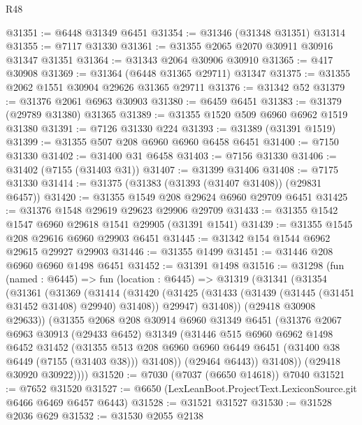 \begin{lexlean}{R48}
\begin{coremodule}
@31351 := @6448 @31349 @6451
@31354 := @31346 (@31348 @31351) @31314
@31355 := @7117 @31330
@31361 := @31355 @2065 @2070 @30911 @30916 @31347 @31351
@31364 := @31343 @2064 @30906 @30910
@31365 := @417 @30908
@31369 := @31364 (@6448 @31365 @29711) @31347
@31375 := @31355 @2062 @1551 @30904 @29626 @31365 @29711
@31376 := @31342 @52
@31379 := @31376 @2061 @6963 @30903
@31380 := @6459 @6451
@31383 := @31379 (@29789 @31380) @31365
@31389 := @31355 @1520 @509 @6960 @6962 @1519 @31380
@31391 := @7126 @31330 @224
@31393 := @31389 (@31391 @1519)
@31399 := @31355 @507 @208 @6960 @6960 @6458 @6451
@31400 := @7150 @31330
@31402 := @31400 @31 @6458
@31403 := @7156 @31330
@31406 := @31402 (@7155 (@31403 @31))
@31407 := @31399 @31406
@31408 := @7175 @31330
@31414 := @31375 (@31383 (@31393 (@31407 @31408)) (@29831 @6457))
@31420 := @31355 @1549 @208 @29624 @6960 @29709 @6451
@31425 := @31376 @1548 @29619 @29623 @29906 @29709
@31433 := @31355 @1542 @1547 @6960 @29618 @1541 @29905 (@31391 @1541)
@31439 := @31355 @1545 @208 @29616 @6960 @29903 @6451
@31445 := @31342 @154 @1544 @6962 @29615 @29927 @29903
@31446 := @31355 @1499
@31451 := @31446 @208 @6960 @6960 @1498 @6451
@31452 := @31391 @1498
@31516 := @31298
    (fun (named : @6445) =>
    fun (location : @6445) =>
    @31319
      (@31341
        (@31354
          (@31361
            (@31369
              (@31414
                (@31420
                  (@31425 (@31433 (@31439 (@31445 (@31451 @31452 @31408) @29940) @31408)) @29947)
                  @31408))
              (@29418 @30908 @29633))
            (@31355
              @2068
              @208
              @30914
              @6960
              @31349
              @6451
              (@31376
                @2067
                @6963
                @30913
                (@29433 @6452)
                @31349
                (@31446
                  @515
                  @6960
                  @6962
                  @1498
                  @6452
                  @31452
                  (@31355
                    @513
                    @208
                    @6960
                    @6960
                    @6449
                    @6451
                    (@31400 @38 @6449 (@7155 (@31403 @38)))
                    @31408))
                (@29464 @6443))
              @31408))
          (@29418 @30920 @30922))))
@31520 := @7030 (@7037 (@6650 @14618)) @7040
@31521 := @7652 @31520
@31527 := @6650 (LexLeanBoot.ProjectText.LexiconSource.git @6466 @6469 @6457 @6443)
@31528 := @31521 @31527
@31530 := @31528 @2036 @629
@31532 := @31530 @2055 @2138

\end{coremodule}
\end{lexlean}
